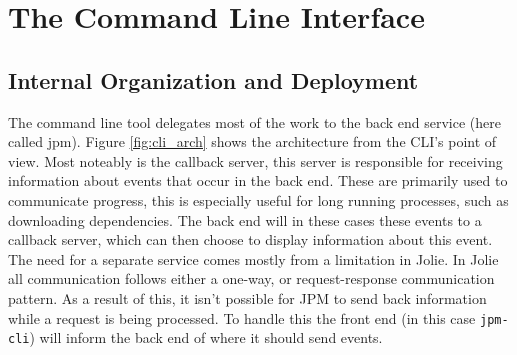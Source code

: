 
\section{The Command Line Interface}

%

\subsection{Internal Organization and Deployment}

The command line tool delegates most of the work to the back end service (here
called jpm). Figure \ref{fig:cli_arch} shows the architecture from the CLI's
point of view. Most noteably is the callback server, this server is responsible
for receiving information about events that occur in the back end. These are
primarily used to communicate progress, this is especially useful for long
running processes, such as downloading dependencies. The back end will in these
cases these events to a callback server, which can then choose to display
information about this event. The need for a separate service comes mostly from
a limitation in Jolie. In Jolie all communication follows either a one-way, or
request-response communication pattern. As a result of this, it isn't possible
for JPM to send back information while a request is being processed. To handle
this the front end (in this case \texttt{jpm-cli}) will inform the
back end of where it should send events.

